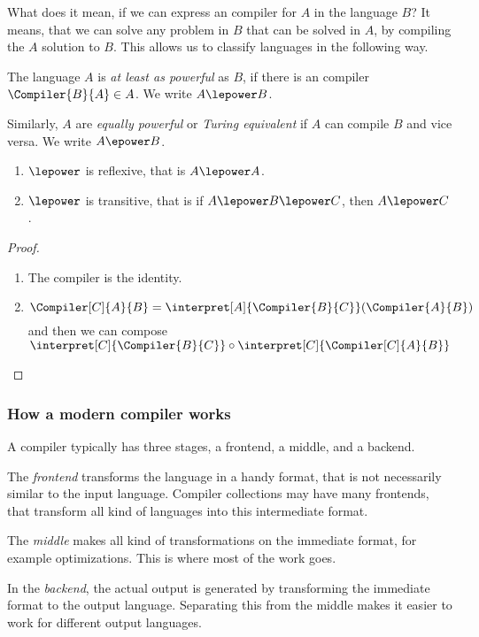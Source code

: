 What does it mean, if we can express an compiler for $A$ in the language 
$B$? It means, that we can solve any problem in $B$ that can be solved in $A$, 
by compiling the $A$ solution to $B$. This allows us to classify languages 
in the following way.

\begin{defn}
	\label{def:power}
	The language $A$ is {\em at least as powerful} as $B$, if there is an 
	compiler $\Compiler{B}{A}\in A$. We write $A \lepower B$.

	Similarly, $A$ are {\em equally powerful} or {\em Turing equivalent} if $A$
	can compile $B$ and vice versa. We write $A \epower B$.
\end{defn}

\begin{theorem}
	\begin{enumerate}
		\item $\lepower$ is reflexive, that is $A\lepower A$.
		\item $\lepower$ is transitive, that is if $A\lepower B\lepower C$, then $A\lepower C$.
	\end{enumerate}
\end{theorem}
\begin{proof}
	\begin{enumerate}
		\item The compiler is the identity.
		\item \[\Compiler[C]{A}{B} = \interpret[A]{\Compiler{B}{C}}(\Compiler{A}{B})\]
			and then we can compose $\interpret[C]{\Compiler{B}{C}} \circ \interpret[C]{\Compiler[C]{A}{B}}$
	\end{enumerate}
\end{proof}

\subsubsection{How a modern compiler works}
A compiler typically has three stages, a frontend, a middle, and a backend.

The {\em frontend} transforms the language in a handy format, that is not 
necessarily similar to the input language. Compiler collections may have many 
frontends, that transform all kind of languages into this intermediate format.

The {\em middle} makes all kind of transformations on the immediate format, 
for example optimizations. This is where most of the work goes\citationneeded.

In the {\em backend}, the actual output is generated by transforming the 
immediate format to the output language. Separating this from the middle 
makes it easier to work for different output languages.

